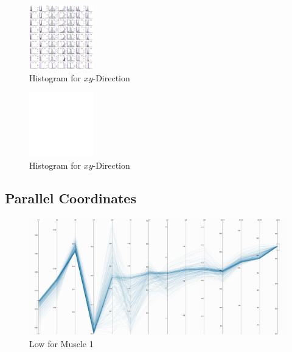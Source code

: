 \begin{figure}[ht]
   \begin{center}
    \includegraphics[width=0.25\textwidth]{YalphaProgression.pdf}
  \end{center}
  \caption{Histogram for $xy$-Direction}
  \label{fig_yhisto}
\end{figure}

\begin{figure}[ht]
   \begin{center}
    \includegraphics[width=0.25\textwidth]{XYalphaProgression.pdf}
  \end{center}
  \caption{Histogram for $xy$-Direction}
  \label{fig_xyhisto}
\end{figure}

\subsection{Parallel Coordinates}

\begin{figure}[ht]
   \begin{center}
    \includegraphics[width=1.0\textwidth]{figs/X_a8_lower.png}
  \end{center}
  \caption{Low for Muscle 1}
  \label{fig_low}
\end{figure}


